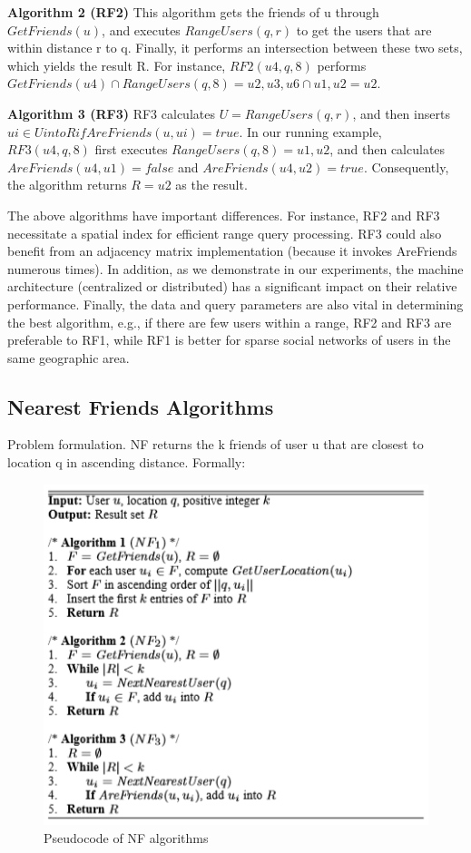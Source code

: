 \documentclass[prodmode,acmtods]{acmsmall} %
\begin{document}
\textbf{Algorithm 2 (RF2)}
\newline
This algorithm gets the friends of u through
$GetFriends(u)$, and executes $RangeUsers(q, r)$ to get the users
that are within distance r to q. Finally, it performs an intersection
between these two sets, which yields the result R. For instance,
$RF2(u4, q, 8)$ performs $GetFriends(u4) ∩ RangeUsers(q, 8) =
{u2, u3, u6} ∩ {u1, u2} = {u2}$.

\textbf{Algorithm 3 (RF3)}
\newline
RF3 calculates $U = RangeUsers(q, r)$, and
then inserts $ui ∈ U into R if AreFriends(u, ui) = true.$ In our
running example, $RF3(u4, q, 8)$ first executes $RangeUsers(q, 8)
= {u1, u2}$, and then calculates $AreFriends(u4, u1) = false$ and
$AreFriends(u4, u2) = true$. Consequently, the algorithm returns
$R = {u2}$ as the result.


The above algorithms have important differences. For instance,
RF2 and RF3 necessitate a spatial index for efficient range query
processing. RF3 could also benefit from an adjacency matrix implementation
(because it invokes AreFriends numerous times). In
addition, as we demonstrate in our experiments, the machine architecture
(centralized or distributed) has a significant impact on their
relative performance. Finally, the data and query parameters are
also vital in determining the best algorithm, e.g., if there are few
users within a range, RF2 and RF3 are preferable to RF1, while
RF1 is better for sparse social networks of users in the same geographic
area.

\subsection{Nearest Friends Algorithms}

Problem formulation. NF returns the k friends of user u that are
closest to location q in ascending distance. Formally:

\begin{figure}[h]
\centering
\includegraphics[width=0.7\linewidth]{./graphics/NF_algorithm}
\caption{Pseudocode of NF algorithms}
\label{fig:NF_algorithm}
\end{figure}
\end{document}
